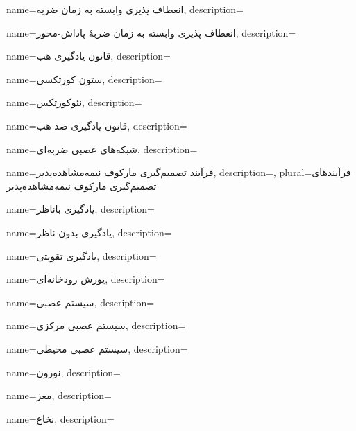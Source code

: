 {
	name={انعطاف پذیری وابسته به زمان ضربه},
	description=\hfill{}
}

{
	name={انعطاف پذیری وابسته به زمان ضربهٔ پاداش-محور},
	description=\hfill{}
}

{
    name={قانون یادگیری هب},
    description=\hfill{}
}

{
name={ستون‌ کورتکسی},
description=\hfill{}
}

{
name={نئوکورتکس},
description=\hfill{}
}

{
    name={قانون یادگیری ضد هب},
    description=\hfill{}
}

{
	name={شبکه‌های عصبی ضربه‌ای},
	description=\hfill{}
}

{
    name={فرآیند تصمیم‌گیری مارکوف نیمه‌مشاهده‌پذیر},
    description=\hfill{},
    plural={فرآیند‌های تصمیم‌گیری مارکوف نیمه‌مشاهده‌پذیر}
}

{
	name={یادگیری باناظر},
	description=\hfill{}
}

{
	name={یادگیری بدون ناظر},
	description=\hfill{}
}

{
	name={یادگیری تقویتی},
	description=\hfill{}
}


{
	name={یورش رودخانه‌ای},
	description=\hfill{}
}

{
	name={سیستم عصبی},
	description=\hfill{}
}

{
	name={سیستم عصبی مرکزی},
	description=\hfill{}
}

{
	name={سیستم عصبی محیطی},
	description=\hfill{}
}

{
	name={نورون},
	description=\hfill{}
}

{
	name={مغز},
	description=\hfill{}
}

{
	name={نخاع},
	description=\hfill{}
}

